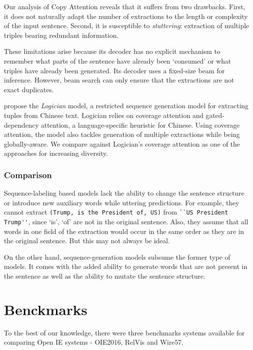             Our analysis of Copy Attention reveals that it suffers from two drawbacks. First, it does not naturally adapt the number of extractions to the length or complexity of the input sentence.  Second, it is susceptible to \emph{stuttering}: extraction of multiple triples bearing redundant information.
            
            These limitations arise because its decoder has no explicit mechanism to remember what parts of the sentence have already been `consumed' or what triples have already been generated. Its decoder uses a fixed-size beam for inference. However, beam search can only ensure that the extractions are not exact duplicates.
        
            \citet{sun2018logician} propose the \emph{Logician} model, a restricted sequence generation model for extracting tuples from Chinese text. Logician relies on coverage attention and gated-dependency attention, a language-specific heuristic for Chinese. Using coverage attention, the model also tackles generation of multiple extractions while being globally-aware. We compare against Logician's coverage attention as one of the approaches for increasing diversity.

        \subsubsection{Comparison}
        Sequence-labeling based models lack the ability to change the sentence structure or introduce new auxiliary words while uttering predictions. For example, they cannot extract \verb|(Trump, is the President of, US)| from \verb|``US President Trump''|, since `is', `of' are not in the original sentence. Also, they assume that all words in one field of the extraction would occur in the same order as they are in the original sentence. But this may not always be ideal. 
    
        On the other hand, sequence-generation models subsume the former type of models. It comes with the added ability to generate words that are not present in the sentence as well as the ability to mutate the sentence structure.


\section{Benckmarks}
    To the best of our knowledge, there were three benchmarks systems available for comparing Open IE systems - OIE2016, RelVis and Wire57.

